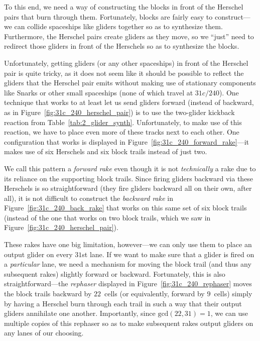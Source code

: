 To this end, we need a way of constructing the blocks in front of the Herschel pairs that burn through them. Fortunately, blocks are fairly easy to construct---we can collide spaceships like gliders together so as to synthesize them. Furthermore, the Herschel pairs create gliders as they move, so we ``just'' need to redirect those gliders in front of the Herschels so as to synthesize the blocks.

Unfortunately, getting gliders (or any other spaceships) in front of the Herschel pair is quite tricky, as it does not seem like it should be possible to reflect the gliders that the Herschel pair emits without making use of stationary components like Snarks or other small spaceships (none of which travel at $31c/240$). One technique that works to at least let us send gliders forward (instead of backward, as in Figure~\ref{fig:31c_240_herschel_pair}) is to use the two-glider kickback reaction from Table~\ref{tab:2_glider_synth}. Unfortunately, to make use of this reaction, we have to place even more of these tracks next to each other. One configuration that works is displayed in Figure~\ref{fig:31c_240_forward_rake}---it makes use of six Herschels and six block trails instead of just two.

We call this pattern a \emph{forward rake} even though it is not \emph{technically} a rake due to its reliance on the supporting block trails. Since firing gliders backward via these Herschels is so straightforward (they fire gliders backward all on their own, after all), it is not difficult to construct the \emph{backward rake} in Figure~\ref{fig:31c_240_back_rake} that works on this same set of six block trails (instead of the one that works on two block trails, which we saw in Figure~\ref{fig:31c_240_herschel_pair}).

These rakes have one big limitation, however---we can only use them to place an output glider on every $31$st lane. If we want to make sure that a glider is fired on a \emph{particular} lane, we need a mechanism for moving the block trail (and thus any subsequent rakes) slightly forward or backward. Fortunately, this is also straightforward---the \emph{rephaser} displayed in Figure~\ref{fig:31c_240_rephaser} moves the block trails backward by $22$~cells (or equivalently, forward by $9$~cells) simply by having a Herschel burn through each trail in such a way that their output gliders annihilate one another. Importantly, since $\mathrm{gcd}(22,31) = 1$, we can use multiple copies of this rephaser so as to make subsequent rakes output gliders on any lanes of our choosing.

